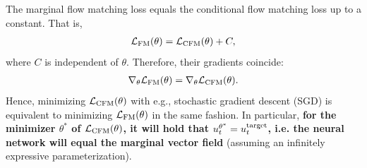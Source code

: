 \begin{theorem}
\label{thm:fm_loss} 
The marginal flow matching loss equals the conditional flow matching loss up to a constant. That is,
\begin{align*}
\mathcal{L}_{\text{FM}}(\theta) = \mathcal{L}_{\text{CFM}}(\theta) + C,
\end{align*}
where $C$ is independent of $\theta$. Therefore, their gradients coincide:
\begin{align*}
\nabla_\theta \mathcal{L}_{\text{FM}}(\theta) = \nabla_\theta \mathcal{L}_{\text{CFM}}(\theta).
\end{align*}
Hence, minimizing $\mathcal{L}_{\text{CFM}}(\theta)$ with e.g., stochastic gradient descent (SGD) is equivalent to minimizing $\mathcal{L}_{\text{FM}}(\theta)$ in the same fashion. In particular, \textbf{for the minimizer $\theta^*$ of $\mathcal{L}_{\text{CFM}}(\theta)$, it will hold that $u_t^{\theta^*}=u^{\text{target}}_t$, i.e. the neural network will equal the marginal vector field} (assuming an infinitely expressive parameterization). 
\end{theorem}
